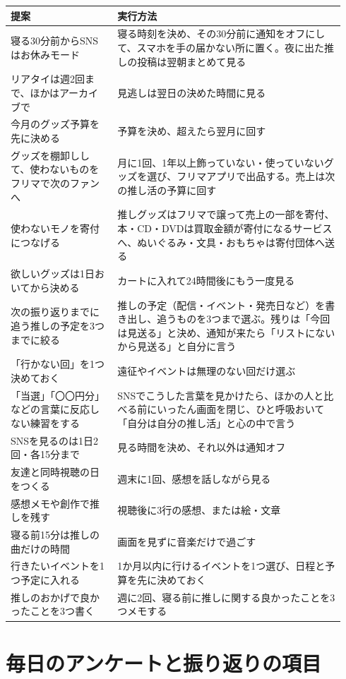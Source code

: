 \begin{longtable}{@{}p{0.3\linewidth}p{0.64\linewidth}@{}}
\toprule 提案 & 実行方法 \\ \midrule \endhead \bottomrule \endfoot
寝る30分前からSNSはお休みモード & 寝る時刻を決め、その30分前に通知をオフにして、スマホを手の届かない所に置く。夜に出た推しの投稿は翌朝まとめて見る \\
リアタイは週2回まで、ほかはアーカイブで & 見逃しは翌日の決めた時間に見る \\
今月のグッズ予算を先に決める & 予算を決め、超えたら翌月に回す \\
グッズを棚卸しして、使わないものをフリマで次のファンへ & 月に1回、1年以上飾っていない・使っていないグッズを選び、フリマアプリで出品する。売上は次の推し活の予算に回す \\
使わないモノを寄付につなげる & 推しグッズはフリマで譲って売上の一部を寄付、本・CD・DVDは買取金額が寄付になるサービスへ、ぬいぐるみ・文具・おもちゃは寄付団体へ送る \\
欲しいグッズは1日おいてから決める & カートに入れて24時間後にもう一度見る \\
次の振り返りまでに追う推しの予定を3つまでに絞る & 推しの予定（配信・イベント・発売日など）を書き出し、追うものを3つまで選ぶ。残りは「今回は見送る」と決め、通知が来たら「リストにないから見送る」と自分に言う \\
「行かない回」を1つ決めておく & 遠征やイベントは無理のない回だけ選ぶ \\
「当選」「〇〇円分」などの言葉に反応しない練習をする & SNSでこうした言葉を見かけたら、ほかの人と比べる前にいったん画面を閉じ、ひと呼吸おいて「自分は自分の推し活」と心の中で言う \\
SNSを見るのは1日2回・各15分まで & 見る時間を決め、それ以外は通知オフ \\
友達と同時視聴の日をつくる & 週末に1回、感想を話しながら見る \\
感想メモや創作で推しを残す & 視聴後に3行の感想、または絵・文章 \\
寝る前15分は推しの曲だけの時間 & 画面を見ずに音楽だけで過ごす \\
行きたいイベントを1つ予定に入れる & 1か月以内に行けるイベントを1つ選び、日程と予算を先に決めておく \\
推しのおかげで良かったことを3つ書く & 週に2回、寝る前に推しに関する良かったことを3つメモする \\
\end{longtable}

\chapter{毎日のアンケートと振り返りの項目}
\label{app:weekly}
